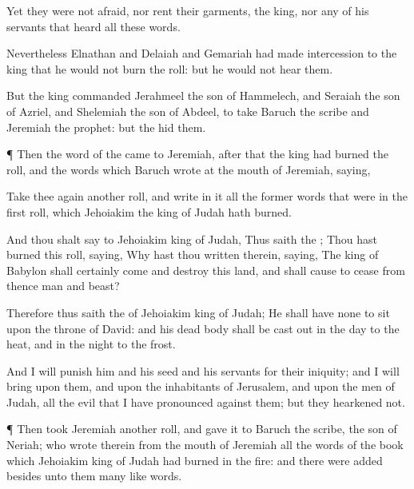{Yet they were not
afraid, nor
rent their
garments,
{} the
king, nor any of his
servants that
heard all these
words.

Nevertheless
Elnathan and
Delaiah and
Gemariah had made
intercession to the
king that he would not
burn the
roll: but he would not
hear them.

But the
king
commanded
Jerahmeel the
son of
Hammelech, and
Seraiah the
son of
Azriel, and
Shelemiah the
son of
Abdeel, to
take
Baruch the
scribe and
Jeremiah the
prophet: but the
{}
hid them.


\par }{\PP {}¶ Then the
word of the
{} came to
Jeremiah,
after that the
king had
burned the
roll, and the
words which
Baruch
wrote at the
mouth of
Jeremiah,
saying,

Take thee
again
another
roll, and
write in it all the
former
words that were in the
first
roll, which
Jehoiakim the
king of
Judah hath
burned.

And thou shalt
say to
Jehoiakim
king of
Judah, Thus
saith the
{}; Thou hast
burned this
roll,
saying, Why hast thou
written therein,
saying, The
king of
Babylon shall
certainly
come and
destroy this
land, and shall cause to
cease from thence
man and
beast?

Therefore thus
saith the
{} of
Jehoiakim
king of
Judah; He shall have none to
sit upon the
throne of
David: and his dead
body shall be cast
out in the
day to the
heat, and in the
night to the
frost.

And I will
punish him and his
seed and his
servants for their
iniquity; and I will
bring upon them, and upon the
inhabitants of
Jerusalem, and upon the
men of
Judah, all the
evil that I have
pronounced against them; but they
hearkened not.


\par }{\PP {}¶ Then
took
Jeremiah
another
roll, and
gave it to
Baruch the
scribe, the
son of
Neriah; who
wrote therein from the
mouth of
Jeremiah all the
words of the
book which
Jehoiakim
king of
Judah had
burned in the
fire: and there were
added besides unto them
many
like
words.




\par }
